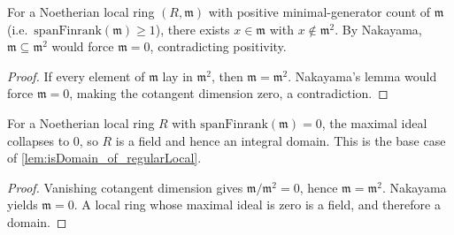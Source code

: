 \begin{lemma}\leanok
  \label{lem:exists_notMemSq_of_spanFinrank_pos}
  For a Noetherian local ring \((R, \mathfrak m)\) with positive minimal-generator count
  of \(\mathfrak m\) (i.e.\ \(\text{spanFinrank}(\mathfrak m) \geq 1\)), there exists
  \(x \in \mathfrak m\) with \(x \notin \mathfrak m^2\). By Nakayama, \(\mathfrak m \subseteq \mathfrak m^2\)
  would force \(\mathfrak m = 0\), contradicting positivity.
\end{lemma}
\begin{proof}

\leanok
  If every element of \(\mathfrak m\) lay in \(\mathfrak m^2\), then
  \(\mathfrak m=\mathfrak m^2\). Nakayama's lemma would force
  \(\mathfrak m=0\), making the cotangent dimension zero, a contradiction.
\end{proof}

\begin{lemma}\leanok
  \label{lem:isDomain_of_isLocalRing_of_spanFinrank_maximalIdeal_eq_zero}
  For a Noetherian local ring \(R\) with \(\text{spanFinrank}(\mathfrak m) = 0\), the maximal
  ideal collapses to \(0\), so \(R\) is a field and hence an integral domain. This is the
  base case of \cref{lem:isDomain_of_regularLocal}.
\end{lemma}
\begin{proof}

\leanok
  Vanishing cotangent dimension gives
  \(\mathfrak m/\mathfrak m^2=0\), hence
  \(\mathfrak m=\mathfrak m^2\). Nakayama yields \(\mathfrak m=0\).
  A local ring whose maximal ideal is zero is a field, and therefore a domain.
\end{proof}

